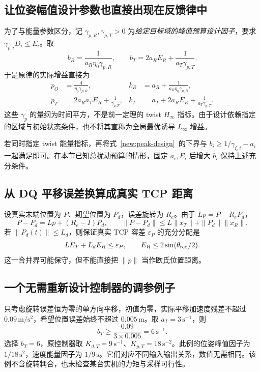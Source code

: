 \subsection{让位姿幅值设计参数也直接出现在反馈律中}

为了与能量参数区分，记 $\gamma_{p,R},\gamma_{p,T}>0$ 为\emph{给定目标域的峰值预算设计因子}，要求 $\gamma_{p,i}D_i\le E_i$。取
\begin{equation}
b_R=\frac1{a_R\eta_0\gamma_{p,R}},\qquad
b_T=2a_RE_R+\frac1{a_T\gamma_{p,T}}.
\label{new:peak-gamma}
\end{equation}
于是原律的实际增益直接为
\begin{align}
p_O&=\frac4{\eta_0\gamma_{p,R}},
&k_R&=a_R+\frac1{a_R\eta_0\gamma_{p,R}},\label{new:explicit-R}\\
p_T&=2a_Ra_TE_R+\frac1{\gamma_{p,T}},
&k_T&=a_T+2a_RE_R+\frac1{a_T\gamma_{p,T}}.\label{new:explicit-T}
\end{align}
这些 $\gamma_p$ 的量纲为时间平方，不是前一定理的 twist $H_\infty$ 指标。由于设计依赖指定的区域与初始状态条件，也不将其宣称为全局最优诱导 $L_\infty$ 增益。

若同时指定 twist 能量指标，再将式~\eqref{new:peak-design}~的下界与 $b_i\ge1/\gamma_{\xi,i}-a_i$ 一起满足即可。在本节已知总扰动预算的情形，固定 $a_i,E_i$ 后增大 $b_i$ 保持上述充分条件。

\subsection{从 DQ 平移误差换算成真实 TCP 距离}

设真实末端位置为 $P$、期望位置为 $P_d$，误差旋转为 $R_e$。由于 $Lp=P-R_eP_d$，
\[
P-P_d=Lp+(R_e-I)P_d,
\qquad
\|P-P_d\|\le L\|x_T\|+\|P_d\|\|x_R\|.
\]
若 $\|P_d(t)\|\le L_d$，则保证真实 TCP 容差 $\varepsilon_P$ 的充分分配是
\[
LE_T+L_dE_R\le\varepsilon_P,
\qquad E_R\le2\sin(\theta_{\rm req}/2).
\]
这一合并界可能保守，但不能直接把 $\|p\|$ 当作欧氏位置距离。

\subsection{一个无需重新设计控制器的调参例子}

只考虑旋转误差恒为零的单方向平移，初值为零，实际平移加速度残差不超过 $0.09\,\mathrm{m/s^2}$，希望位置误差始终不超过 $0.005\,\mathrm m$。取 $a_T=3\,\mathrm{s^{-1}}$，则
\[
b_T\ge\frac{0.09}{3\times0.005}=6\,\mathrm{s^{-1}}.
\]
选择 $b_T=6$，原控制器取 $K_{d,T}=9\,\mathrm{s^{-1}}$、$K_{p,T}=18\,\mathrm{s^{-2}}$。此例的位姿峰值因子为 $1/18\,\mathrm{s^2}$，速度能量因子为 $1/9\,\mathrm s$。它们对应不同输入输出关系，数值无需相同。该例不含旋转耦合，也未检查某台实机的力矩与采样可行性。

